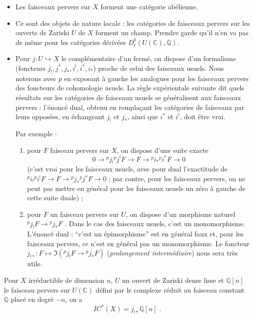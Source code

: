 \documentclass[12pt,a4paper]{article}
\theoremstyle{plain}
\theoremstyle{definition}
\theoremstyle{remark}
\newcommand{\IC}{\mathit{IC}}
\newcommand{\CC}{\mathbb{C}}
\newcommand{\QQ}{\mathbb{Q}}
\begin{document}
\begin{itemize}
\item Les faisceaux pervers sur $X$ forment une catégorie abélienne.
\item Ce sont des objets de nature locale : les catégories de faisceaux pervers sur les ouverts de Zariski $U$ de $X$ forment un champ. Prendre garde qu'il n'en va pas de même pour les catégories dérivées $D^{b}_{c}(U(\CC), \QQ)$.
\item Pour $j : U \hookrightarrow X$ le complémentaire d'un fermé, on dispose d'un formalisme (foncteurs $j_{!}, j^{*}, j_{*}, i^{!}, i^{*}, i_{*}$) proche de celui des faisceaux usuels. Nous noterons avec $p$ en exposant à gauche les analogues pour les faisceaux pervers des foncteurs de cohomologie usuels. La règle expérientale suivante dit quels résultats sur les catégories de faisceaux usuels se généralisent aux faisceaux pervers : l'énoncé dual, obtenu en remplaçant les catégories de faisceaux par leurs opposées, en échangeant $j_{!}$ et $j_{*}$, ainsi que $i^{*}$ et $i^{!}$, doit être vrai.

Par exemple :
\begin{enumerate}[label=\alph*)]
\item pour $F$ faisceau pervers sur $X$, on dispose d'une suite exacte
\[
0 \to {}^{p}j_{!}{}^{p}j^{!}F \to F \to {}^{p}i_{*}{}^{p}i^{*}F \to 0
\]
(c'est vrai pour les faisceaux usuels, avec pour dual l'exactitude de ${}^{p}i_{!}{}^{p}i^{!}F \to F \to {}^{p}j_{*}{}^{p}j^{*}F \to 0$ ; par contre, pour les faisceaux pervers, on ne peut pas mettre en général pour les faisceaux usuels un zéro à gauche de cette suite duale) ;
\item pour $F$ un faisceau pervers sur $U$, on dispose d'un morphisme naturel ${}^{p}j_{!}F \to {}^{p}j_{*}F$ . Dans le cas des faisceaux usuels, c'est un monomorphisme. L'énoncé dual : ``c'est un épimorphisme'' est en général faux et, pour les faisceaux pervers, ce n'est en général pas un monomorphisme. Le foncteur $j_{!*} : F \mapsto \Im({}^{p}j_{!}F \to {}^{p}j_{*}F)$ (\emph{prolongement intermédiaire}) nous sera très utile.
\end{enumerate}
\end{itemize}

\medskip

Pour $X$ irréductible de dimension $n$, $U$ un ouvert de Zariski dense lisse et $\QQ[n]$ le faisceau pervers sur $U(\CC)$ défini par le complexe réduit au faisceau constant $\QQ$ placé en degré $-n$, on a
\[
\IC^{*}(X) = j_{!*}\QQ[n]\;.
\]
\end{document}
